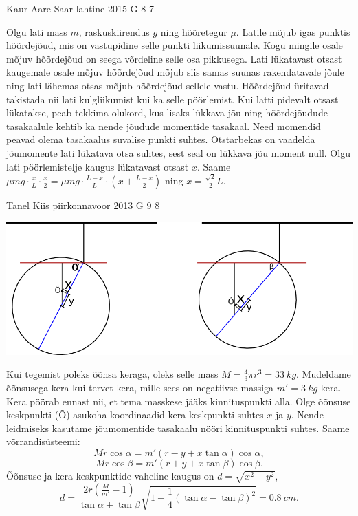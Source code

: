 \documentclass[11pt, twoside]{article}
\begin{document}
{%
{Kaur Aare Saar} %
{lahtine} %
{2015} %
{G 8} %
{7} %
{

\ifSolution
Olgu lati mass $m$, raskuskiirendus $g$ ning hõõretegur $\mu$. Latile mõjub igas punktis hõõrdejõud, mis on vastupidine selle punkti liikumissuunale. Kogu mingile osale mõjuv hõõrdejõud on seega võrdeline selle osa pikkusega. Lati lükatavast otsast kaugemale osale mõjuv hõõrdejõud mõjub siis samas suunas rakendatavale jõule ning lati lähemas otsas mõjub hõõrdejõud sellele vastu. Hõõrdejõud üritavad takistada nii lati kulgliikumist kui ka selle pöörlemist. Kui latti pidevalt otsast lükatakse, peab tekkima olukord, kus lisaks lükkava jõu ning hõõrdejõudude tasakaalule kehtib ka nende jõudude momentide tasakaal. Need momendid peavad olema tasakaalus suvalise punkti suhtes. Otstarbekas on vaadelda jõumomente lati lükatava otsa suhtes, sest seal on lükkava jõu moment null. Olgu lati pöörlemistelje kaugus lükatavast otsast $x$. Saame $\mu mg \cdot \frac{x}{L} \cdot \frac{x}{2}=\mu mg \cdot \frac{L-x}{L} \cdot \left(x+\frac{L-x}{2}\right)$ ning $x=\frac{\sqrt{2}}{2}L$.
\fi
}

{Tanel Kiis} %
{piirkonnavoor} %
{2013} %
{G 9} %
{8} %
{

\ifSolution
\begin{center}
\includegraphics[width=\textwidth]{2013-v2g-09-kera.png}
\end{center}

Kui tegemist poleks õõnsa keraga, oleks selle mass $M=\frac{4}{3}\pi r^3 = \SI{33}{kg}$. Mudeldame õõnsusega kera kui tervet kera, mille sees on negatiivse massiga $m'=\SI{3}{kg}$ kera. Kera pöörab ennast nii, et tema masskese jääks kinnituspunkti alla. Olge õõnsuse keskpunkti (Õ) asukoha koordinaadid kera keskpunkti suhtes $x$ ja $y$. Nende leidmiseks kasutame jõumomentide tasakaalu nööri kinnituspunkti suhtes. Saame võrrandisüsteemi:
\[Mr \cos \alpha = m'(r-y+x \tan \alpha) \cos \alpha,\]
\[Mr \cos \beta = m'(r+y+x \tan \beta) \cos \beta.\]
Õõnsuse ja kera keskpunktide vaheline kaugus on $d=\sqrt{x^2+y^2}$,
\[ d=\frac{2r(\frac{M}{m'}-1)}{\tan\alpha+\tan\beta}\sqrt{1+\frac{1}{4}(\tan\alpha-\tan\beta)^2} = \SI{0,8}{cm}. \]
\fi
}

}
\end{document}
